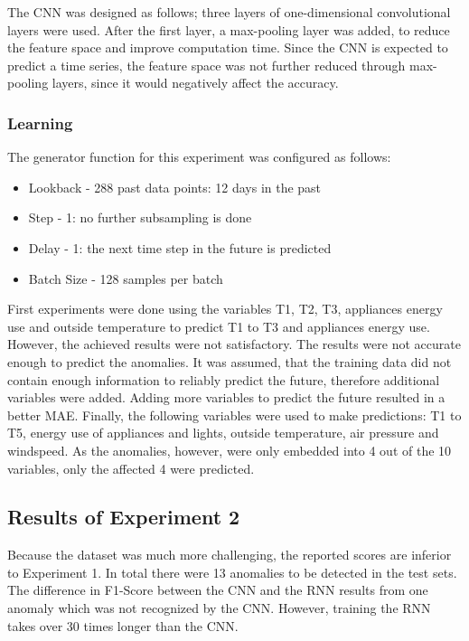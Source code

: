 The CNN was designed as follows; three layers of one-dimensional convolutional layers were used. After the first layer, a max-pooling layer was added, to reduce the feature space and improve computation time. Since the CNN is expected to predict a time series, the feature space was not further reduced through max-pooling layers, since it would negatively affect the accuracy.  

\subsubsection{Learning}
The generator function for this experiment was configured as follows:

\begin{itemize}
	\item Lookback - 288 past data points: 12 days in the past
	\item Step - 1: no further subsampling is done
	\item Delay - 1: the next time step in the future is predicted
	\item Batch Size - 128 samples per batch
\end{itemize}

First experiments were done using the variables T1, T2, T3, appliances energy use and outside temperature to predict T1 to T3 and appliances energy use. However, the achieved results were not satisfactory. The results were not accurate enough to predict the anomalies. It was assumed, that the training data did not contain enough information to reliably predict the future, therefore additional variables were added. Adding more variables to predict the future resulted in a better MAE. Finally, the following variables were used to make predictions: T1 to T5, energy use of appliances and lights, outside temperature, air pressure and windspeed. As the anomalies, however, were only embedded into 4 out of the 10 variables, only the affected 4 were predicted.


\subsection{Results of Experiment 2}
Because the dataset was much more challenging, the reported scores are inferior to Experiment 1. In total there were 13 anomalies to be detected in the test sets. The difference in F1-Score between the CNN and the RNN results from one anomaly which was not recognized by the CNN. However, training the RNN takes over 30 times longer than the CNN.


